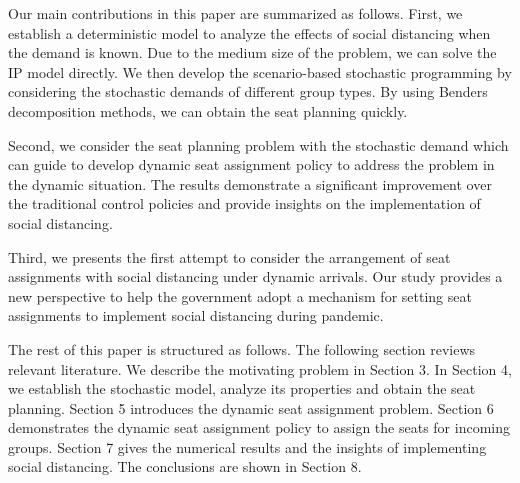 

Our main contributions in this paper are summarized as follows. First, we establish a deterministic model to analyze the effects of social distancing when the demand is known. Due to the medium size of the problem, we can solve the IP model directly. We then develop the scenario-based stochastic programming by considering the stochastic demands of different group types. By using Benders decomposition methods, we can obtain the seat planning quickly. 

Second, we consider the seat planning problem with the stochastic demand which can guide to develop dynamic seat assignment policy to address the problem in the dynamic situation. The results demonstrate a significant improvement over the traditional control policies and provide insights on the implementation of social distancing.

Third, we presents the first attempt to consider the arrangement of seat assignments with social distancing under dynamic arrivals. Our study provides a new perspective to help the government adopt a mechanism for setting seat assignments to implement social distancing during pandemic.



The rest of this paper is structured as follows. The following section reviews relevant literature. We describe the motivating problem in Section 3. In Section 4, we establish the stochastic model, analyze its properties and obtain the seat planning. Section 5 introduces the dynamic seat assignment problem.
Section 6 demonstrates the dynamic seat assignment policy to assign the seats for incoming groups. Section 7 gives the numerical results and the insights of implementing social distancing. The conclusions are shown in Section 8.
\newpage
